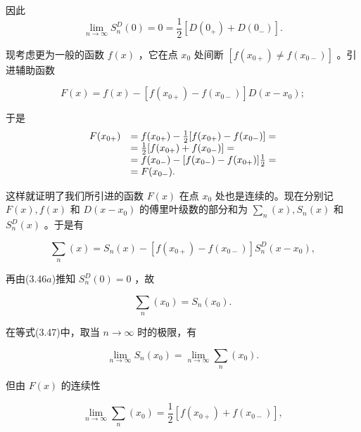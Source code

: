 因此
\begin{equation*}
\lim _ {n \rightarrow \infty} S _ {n} ^ {D} (0) = 0 = \frac {1}{2} [ D (0 _ {+}) + D (0 _ {-}) ].\tag{3.46b}
\end{equation*}

现考虑更为一般的函数 $f(x)$ ，它在点 $x_0$ 处间断 $[f(x_{0+}) \neq f(x_{0-})]$ 。引进辅助函数

\begin{equation*}
F (x) = f (x) - \left[ f \left(x _ {0 +}\right) - f \left(x _ {0 -}\right) \right] D \left(x - x _ {0}\right);
\end{equation*}

于是
\begin{equation*}
\begin{array}{r l} F (x _ {0 +}) & = f (x _ {0 +}) - \frac {1}{2} [ f (x _ {0 +}) - f (x _ {0 -}) ] = \\ & = \frac {1}{2} [ f (x _ {0 +}) + f (x _ {0 -}) ] = \\ & = f (x _ {0 -}) - [ f (x _ {0 -}) - f (x _ {0 +}) ] \frac {1}{2} = \\ & = F (x _ {0 -}). \end{array}
\end{equation*}

这样就证明了我们所引进的函数 $F(x)$ 在点 $x_0$ 处也是连续的。现在分别记 $F(x), f(x)$ 和 $D(x - x_0)$ 的傅里叶级数的部分和为 $\sum_{n}(x), S_n(x)$ 和 $S_n^D(x)$ 。于是有

\begin{equation*}
\sum_ {n} (x) = S _ {n} (x) - \left[ f \left(x _ {0 +}\right) - f \left(x _ {0 -}\right) \right] S _ {n} ^ {D} \left(x - x _ {0}\right),
\end{equation*}

再由(3.46$a$)推知 $S_{n}^{D}(0) = 0$ ，故

\begin{equation*}
\sum_ {n} (x _ {0}) = S _ {n} (x _ {0}).\tag{3.47}
\end{equation*}

在等式(3.47)中，取当 $n \to \infty$ 时的极限，有

\begin{equation*}
\lim _ {n \rightarrow \infty} S _ {n} (x _ {0}) = \lim _ {n \rightarrow \infty} \sum_ {n} (x _ {0}).\tag{3.48}
\end{equation*}

但由 $F(x)$ 的连续性

\begin{equation*}
\lim _ {n \rightarrow \infty} \sum_ {n} (x _ {0}) = \frac {1}{2} [ f (x _ {0 +}) + f (x _ {0 -}) ],
\end{equation*}

